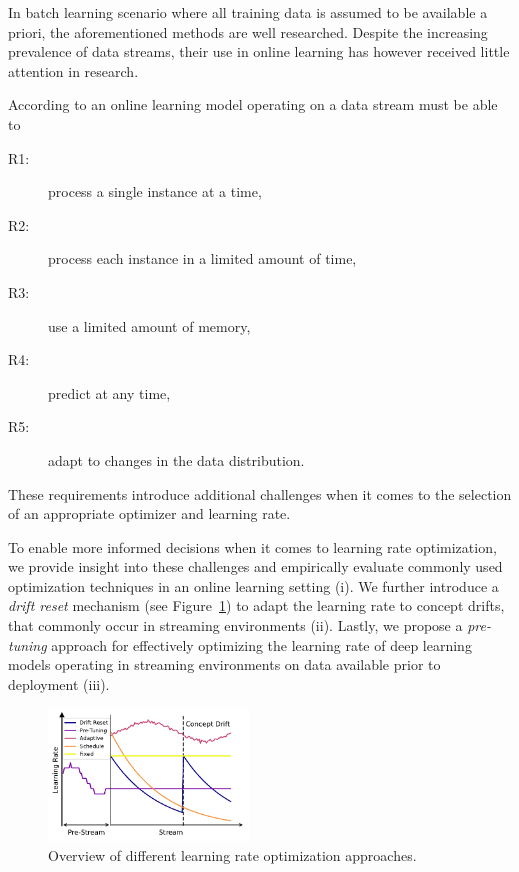 \documentclass[letterpaper]{article} %
\begin{document}
In batch learning scenario where all training data is assumed to be available a priori, the aforementioned methods are well researched.
Despite the increasing prevalence of data streams, their use in online learning has however received little attention in research.

According to \citet{bifetMOAMassiveOnline2010} an online learning model operating on a data stream must be able to
\begin{center}
	\begin{varwidth}{0.5\textwidth}
		\begin{description}
			\item[R1:] process a single instance at a time,\label{rq:single_instance}
			\item[R2:] process each instance in a limited amount of time,\label{rq:limited_time}
			\item[R3:] use a limited amount of memory,\label{rq:limited_memory}
			\item[R4:] predict at any time,\label{rq:predict_any_time}
			\item[R5:] adapt to changes in the data distribution.\label{rq:adapt_to_drift}
		\end{description}
	\end{varwidth}
\end{center}

These requirements introduce additional challenges when it comes to the selection of an appropriate optimizer and learning rate.

To enable more informed decisions when it comes to learning rate optimization, we provide insight into these challenges and empirically evaluate commonly used optimization techniques in an online learning setting (i).
We further introduce a \textit{drift reset} mechanism (see Figure~\ref{fig:lr_overview}) to adapt the learning rate to concept drifts, that commonly occur in streaming environments (ii).
Lastly, we propose a \textit{pre-tuning} approach for effectively optimizing the learning rate of deep learning models operating in streaming environments on data available prior to deployment (iii).

\begin{figure}
	\centering
	\includegraphics[width=0.474\textwidth]{figures/lr_overview.pdf}
	\caption{Overview of different learning rate optimization approaches.}
	\label{fig:lr_overview}
\end{figure}
\end{document}

